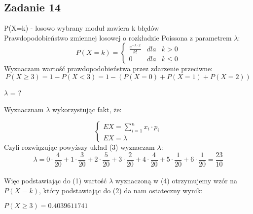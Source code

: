 \subsection{Zadanie 14}

\begin{flushleft}
P(X=k) - losowo wybrany moduł zawiera k błędów \\
Prawdopodobieństwo zmiennej losowej o rozkładzie Poissona z parametrem $\lambda$:
\begin{equation}
    P(X=k)=\left\{\begin{array}{rcl}
                     \frac{e^{-\lambda\cdot x}}{k!}&dla&k>0\\
                     0 & dla & k \le 0
\end{array}\right.
\end{equation}
Wyznaczam wartość prawdopodobieństwa przez zdarzenie przeciwne:\\
\begin{equation}
    P(X \ge 3)=1-P(X<3)=1-(P(X=0)+P(X=1)+P(X=2))
\end{equation}
\begin{center}
$\lambda$ = ?\\
\end{center}
\begin{flushleft}
Wyznacznam $\lambda$ wykorzystując fakt, że:\\
\end{flushleft}
\begin{equation}
\left\{\begin{array}{rcl}
EX=\sum_{i=1}^{n} x_i\cdot p_i\\
EX = \lambda
\end{array}\right.
\end{equation}
Czyli rozwiązując powyższy układ (3) wyznaczam $\lambda$:
\begin{equation}
\lambda = 0\cdot \frac{4}{20}+1\cdot \frac{3}{20}+2\cdot \frac{5}{20}+3\cdot \frac{2}{20}+4\cdot \frac{4}{20}+5\cdot \frac{1}{20}+6\cdot \frac{1}{20} = \frac{23}{10}
\end{equation}
\\
Więc podstawiając do (1) wartość $\lambda$ wyznaczoną w (4) otrzymujemy wzór na $P(X=k)$, który podstawiając do (2) da nam ostateczny wynik:\\ 
\begin{center}
$P(X\ge3)=0.4039611741$
\end{center}
\end{flushleft}
